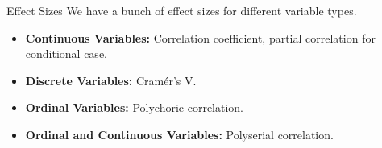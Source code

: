 \documentclass{beamer}
\def\ci{\perp\!\!\!\!\!\perp}
\begin{document}
% 
% 	
% 		
% 	
% 
% 
% 		
% 
% 
% 
% 	
% 				
% 

\begin{frame}{Effect Sizes}
	We have a bunch of effect sizes for different variable types.

	\vspace{2em}
	\begin{itemize}
		\item \textbf{Continuous Variables:} Correlation coefficient, partial correlation for conditional case.
		\item \textbf{Discrete Variables:} Cram\'er's V.
		\item \textbf{Ordinal Variables: } Polychoric correlation.
		\item \textbf{Ordinal and Continuous Variables:} Polyserial correlation.
	\end{itemize}

	\vspace{2em}

\end{frame}
\end{document}
